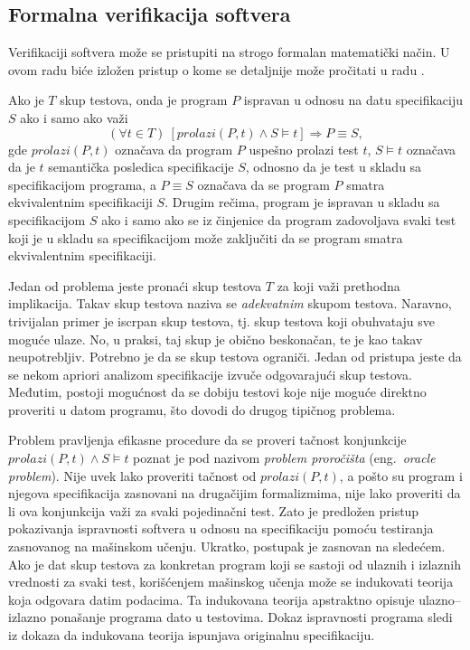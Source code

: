 \documentclass[a4paper]{article}
\theoremstyle{definition}
\begin{document}
{\subsection{Formalna verifikacija softvera}

\par Verifikaciji softvera može se pristupiti na strogo formalan matematički način. U ovom radu biće izložen pristup o kome se detaljnije može pročitati u radu \cite{verify}.

\par Ako je $T$ skup testova, onda je program $P$ ispravan u odnosu na datu specifikaciju $S$ ako i samo ako važi
$$(\forall t\in T)\ [prolazi(P,t)\wedge S\models t]\Rightarrow P\equiv S,$$
gde $prolazi(P,t)$ označava da program $P$ uspešno prolazi test $t$, $S\models t$ označava da je $t$ semantička posledica specifikacije $S$, odnosno da je test u skladu sa specifikacijom programa, a $P\equiv S$ označava da se program $P$ smatra ekvivalentnim specifikaciji $S$. Drugim rečima, program je ispravan u skladu sa specifikacijom $S$ ako i samo ako se iz činjenice da program zadovoljava svaki test koji je u skladu sa specifikacijom može zaključiti da se program smatra ekvivalentnim specifikaciji.

\par Jedan od problema jeste pronaći skup testova $T$ za koji važi prethodna implikacija. Takav skup testova naziva se \emph{adekvatnim} skupom testova. Naravno, trivijalan primer je iscrpan skup testova, tj. skup testova koji obuhvataju sve moguće ulaze. No, u praksi, taj skup je obično beskonačan, te je kao takav neupotrebljiv. Potrebno je da se skup testova ograniči. Jedan od pristupa jeste da se nekom apriori analizom specifikacije izvuče odgovarajući skup testova. Međutim, postoji mogućnost da se dobiju testovi koje nije moguće direktno proveriti u datom programu, što dovodi do drugog tipičnog problema.

\par Problem pravljenja efikasne procedure da se proveri tačnost konjunkcije $prolazi(P,t)\wedge S\models t$ poznat je pod nazivom \emph{problem proročišta} (eng.~{\em oracle problem}). Nije uvek lako proveriti tačnost od $prolazi(P,t)$, a pošto su program i njegova specifikacija zasnovani na drugačijim formalizmima, nije lako proveriti da li ova konjunkcija važi za svaki pojedinačni test. Zato je predložen pristup pokazivanja ispravnosti softvera u odnosu na specifikaciju pomoću testiranja zasnovanog na mašinskom učenju. Ukratko, postupak je zasnovan na sledećem. Ako je dat skup testova za konkretan program koji se sastoji od ulaznih i izlaznih vrednosti za svaki test, korišćenjem mašinskog učenja može se indukovati teorija koja odgovara datim podacima. Ta indukovana teorija apstraktno opisuje ulazno--izlazno ponašanje programa dato u testovima. Dokaz ispravnosti programa sledi iz dokaza da indukovana teorija ispunjava originalnu specifikaciju.

}
\end{document}
